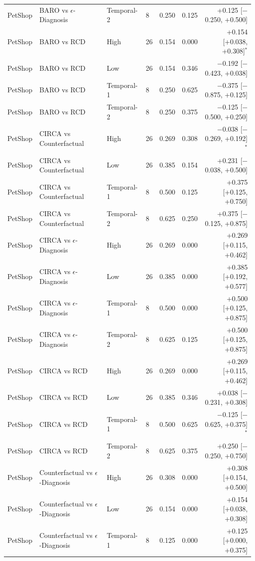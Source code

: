 {\begin{longtable}{llllrrr}
PetShop & BARO vs $\epsilon$-Diagnosis & Temporal-2 & 8 & 0.250 & 0.125 & +0.125 [$-$0.250, +0.500] \\
PetShop & BARO vs RCD & High & 26 & 0.154 & 0.000 & +0.154 [+0.038, +0.308]$^\ast$ \\
PetShop & BARO vs RCD & Low & 26 & 0.154 & 0.346 & $-$0.192 [$-$0.423, +0.038] \\
PetShop & BARO vs RCD & Temporal-1 & 8 & 0.250 & 0.625 & $-$0.375 [$-$0.875, +0.125] \\
PetShop & BARO vs RCD & Temporal-2 & 8 & 0.250 & 0.375 & $-$0.125 [$-$0.500, +0.250] \\
PetShop & CIRCA vs Counterfactual & High & 26 & 0.269 & 0.308 & $-$0.038 [$-$0.269, +0.192]$^\ast$ \\
PetShop & CIRCA vs Counterfactual & Low & 26 & 0.385 & 0.154 & +0.231 [$-$0.038, +0.500] \\
PetShop & CIRCA vs Counterfactual & Temporal-1 & 8 & 0.500 & 0.125 & +0.375 [+0.125, +0.750] \\
PetShop & CIRCA vs Counterfactual & Temporal-2 & 8 & 0.625 & 0.250 & +0.375 [$-$0.125, +0.875] \\
PetShop & CIRCA vs $\epsilon$-Diagnosis & High & 26 & 0.269 & 0.000 & +0.269 [+0.115, +0.462] \\
PetShop & CIRCA vs $\epsilon$-Diagnosis & Low & 26 & 0.385 & 0.000 & +0.385 [+0.192, +0.577] \\
PetShop & CIRCA vs $\epsilon$-Diagnosis & Temporal-1 & 8 & 0.500 & 0.000 & +0.500 [+0.125, +0.875] \\
PetShop & CIRCA vs $\epsilon$-Diagnosis & Temporal-2 & 8 & 0.625 & 0.125 & +0.500 [+0.125, +0.875] \\
PetShop & CIRCA vs RCD & High & 26 & 0.269 & 0.000 & +0.269 [+0.115, +0.462] \\
PetShop & CIRCA vs RCD & Low & 26 & 0.385 & 0.346 & +0.038 [$-$0.231, +0.308] \\
PetShop & CIRCA vs RCD & Temporal-1 & 8 & 0.500 & 0.625 & $-$0.125 [$-$0.625, +0.375]$^\ast$ \\
PetShop & CIRCA vs RCD & Temporal-2 & 8 & 0.625 & 0.375 & +0.250 [$-$0.250, +0.750] \\
PetShop & Counterfactual vs $\epsilon$-Diagnosis & High & 26 & 0.308 & 0.000 & +0.308 [+0.154, +0.500] \\
PetShop & Counterfactual vs $\epsilon$-Diagnosis & Low & 26 & 0.154 & 0.000 & +0.154 [+0.038, +0.308] \\
PetShop & Counterfactual vs $\epsilon$-Diagnosis & Temporal-1 & 8 & 0.125 & 0.000 & +0.125 [+0.000, +0.375] \\

\end{longtable}}
